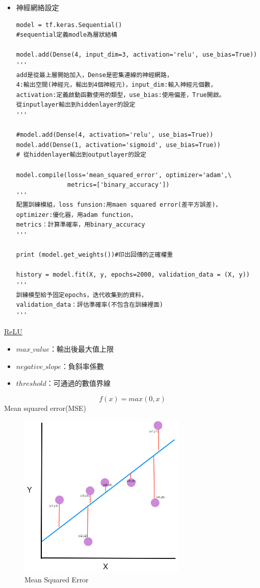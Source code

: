 \documentclass[12pt, a4paper]{article}
\begin{document}
\begin{itemize}
\item 神經網絡設定\\
\begin{lstlisting}
model = tf.keras.Sequential() 
#sequential定義modle為層狀結構

model.add(Dense(4, input_dim=3, activation='relu', use_bias=True))
'''
add是從最上層開始加入，Dense是密集連線的神經網路，
4:輸出空間(神經元，輸出到4個神經元)，input_dim:輸入神經元個數，
activation:定義啟動函數使用的類型，use_bias:使用偏差，True開啟。
從inputlayer輸出到hiddenlayer的設定
'''

#model.add(Dense(4, activation='relu', use_bias=True))
model.add(Dense(1, activation='sigmoid', use_bias=True))
# 從hiddenlayer輸出到outputlayer的設定

model.compile(loss='mean_squared_error', optimizer='adam',\
              metrics=['binary_accuracy'])
'''
配置訓練模組，loss funsion:用maen squared error(差平方誤差)，
optimizer:優化器，用adam function，
metrics：計算準確率，用binary_accuracy
'''

print (model.get_weights())#印出回傳的正確權重

history = model.fit(X, y, epochs=2000, validation_data = (X, y))
'''
訓練模型給予固定epochs，迭代收集到的資料，
validation_data：評估準確率(不包含在訓練裡面)
'''
\end{lstlisting}
\end{itemize}
\href{https://www.tensorflow.org/api_docs/python/tf/keras/layers/ReLU}{\underline{ReLU}}
\begin{itemize}
\item $max\_value$：輸出後最大值上限
\item $negative\_slope$：負斜率係數
\item $threshold$：可通過的數值界線
\end{itemize}
$$f(x)=max(0,x)$$
\newpage
Mean squared error(MSE)
\begin{figure}[hbt!]
\center
\includegraphics[width=8cm]{MSE}
\caption{Mean Squared Error}
\end{figure}
\end{document}
